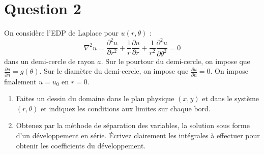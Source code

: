 \section*{Question 2}
On considère l'EDP de Laplace pour $u(r,\theta)$ :
$$\nabla ^2u = \frac{\partial^2u}{\partial r^2} +\frac{1}{r} \frac{\partial u}{\partial r} + \frac{1}{r^2}\frac{\partial^2u}{\partial \theta^2} = 0  $$ dans un demi-cercle de rayon $a$. Sur le pourtour du demi-cercle, on impose que $\frac{\partial u}{\partial n} = g(\theta)$. Sur le diamètre du demi-cercle, on impose que $\frac{\partial u}{\partial n} = 0$. On impose finalement $u = u_0$ en $r = 0$.
\begin{enumerate}
\item Faites un dessin du domaine dans le plan physique $(x,y)$ et dans le système $(r,\theta)$ et indiquez les conditions aux limites sur chaque bord.
\item Obtenez par la méthode de séparation des variables, la solution sous forme d'un développement en série. Écrivez clairement les intégrales à effectuer pour obtenir les coefficients du développement.
\end{enumerate}

